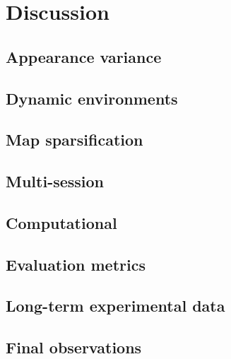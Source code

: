 \section{Discussion}
\label{sec:discussion}

\subsection{Appearance variance}
\label{sec:discussion:appearance}

\subsection{Dynamic environments}
\label{sec:discussion:dynamics}

\subsection{Map sparsification}
\label{sec:discussion:sparsify}

\subsection{Multi-session}
\label{sec:discussion:multisession}

\subsection{Computational}
\label{sec:discussion:computational}

\subsection{Evaluation metrics}
\label{sec:discussion:metrics}

\subsection{Long-term experimental data}
\label{sec:discussion:experiments}



\subsection{Final observations}
\label{sec:discussion:observations}


